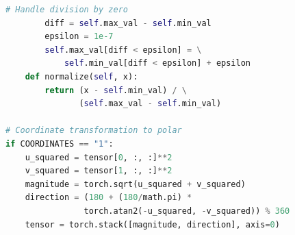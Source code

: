 \documentclass[footline=authortitle]{beamer}
\begin{document}
\begin{frame}[fragile]
\begin{columns}
\begin{column}{0.6\textwidth}
\begin{lstlisting}[language=Python, basicstyle=\ttfamily\tiny]
        # Handle division by zero
        diff = self.max_val - self.min_val
        epsilon = 1e-7
        self.max_val[diff < epsilon] = \
            self.min_val[diff < epsilon] + epsilon
    def normalize(self, x):
        return (x - self.min_val) / \
               (self.max_val - self.min_val)

# Coordinate transformation to polar
if COORDINATES == "1":
    u_squared = tensor[0, :, :]**2
    v_squared = tensor[1, :, :]**2
    magnitude = torch.sqrt(u_squared + v_squared)
    direction = (180 + (180/math.pi) * 
                torch.atan2(-u_squared, -v_squared)) % 360
    tensor = torch.stack([magnitude, direction], axis=0)
\end{lstlisting}
\end{column}
\end{columns}

\end{frame}
\end{document}

